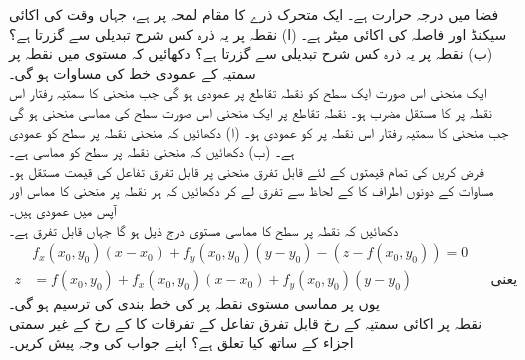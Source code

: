 فضا میں درجہ حرارت  ہے۔ ایک  متحرک ذرے کا مقام لمحہ  پر   ہے، جہاں وقت کی اکائی سیکنڈ اور فاصلہ کی اکائی میٹر ہے۔ (ا)  نقطہ  پر یہ ذرہ کس شرح تبدیلی  سے گزرتا ہے؟  (ب)  نقطہ  پر یہ ذرہ کس شرح تبدیلی  سے گزرتا ہے؟ 
دکھائیں کہ مستوی  میں  نقطہ    پر سمتیہ   کے عمودی خط کی مساوات  ہو گی۔
\\
ایک منحنی اس صورت ایک سطح  کو نقطہ تقاطع پر عمودی ہو گی جب منحنی کا سمتیہ رفتار اس نقطہ پر  کا مستقل مضرب ہو۔ نقطہ تقاطع پر ایک منحنی اس صورت  سطح  کی مماسی منحنی ہو گی جب  منحنی کا سمتیہ رفتار  اس نقطہ پر  کو عمودی ہو۔ (ا) دکھائیں کہ منحنی   نقطہ  پر سطح    کو عمودی ہے۔ (ب) دکھائیں کہ منحنی  نقطہ  پر سطح   کو مماسی ہے۔
\\
فرض کریں  کی تمام قیمتوں کے لئے قابل تفرق منحنی  پر  قابل تفرق تفاعل  کی قیمت  مستقل  ہو۔ مساوات  کے دونوں اطراف کا  کے لحاظ سے تفرق لے کر دکھائیں کہ ہر نقطہ پر منحنی کا مماس اور   آپس میں عمودی ہیں۔ 
\\
دکھائیں کہ نقطہ  پر سطح   کا مماسی مستوی  درج ذیل ہو گا جہاں  قابل تفرق ہے۔
\begin{align*}
&f_x(x_0,y_0)(x-x_0)+f_y(x_0,y_0)(y-y_0)-(z-f(x_0,y_0))=0\\
z&=f(x_0,y_0)+f_x(x_0,y_0)(x-x_0)+f_y(x_0,y_0)(y-y_0)&&\text{یعنی}
\end{align*} 
یوں  پر مماسی مستوی  نقطہ  پر  کی خط بندی کی ترسیم ہو گی۔
\\
نقطہ  پر اکائی سمتیہ   کے رخ قابل تفرق تفاعل   کے تفرقات  کا   کے رخ   کے غیر سمتی اجزاء کے ساتھ کیا  تعلق ہے؟ اپنے جواب کی وجہ پیش کریں۔
